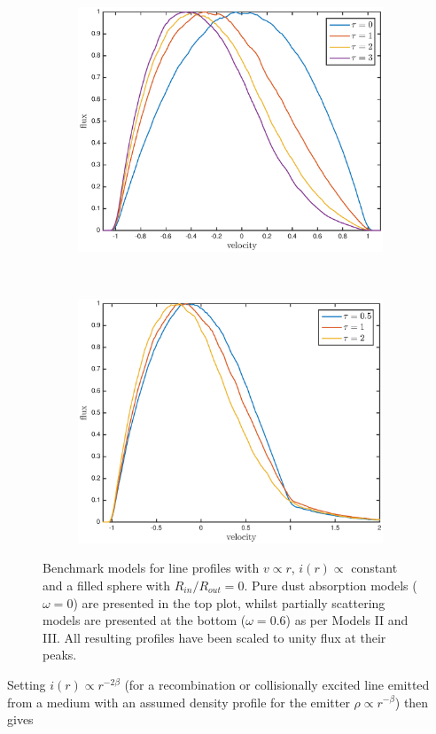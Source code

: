 \begin{figure}
\begin{subfigure}{\textwidth}
\centering
\includegraphics[trim =37 10 45 15,clip=true,scale=0.75]{chapters/chapter4/images/params/opt_thick_w0}
\end{subfigure} \\[1ex]
\begin{subfigure}{\textwidth} 
\centering
\includegraphics[trim =37 10 45 15,clip=true,scale=0.75]{chapters/chapter4/images/params/opt_thick_w0_6}
\end{subfigure}  
\caption{Benchmark models for line profiles  with $v \propto r$, $i(r) \propto$ constant and a filled sphere with $R_{in}/R_{out}=0$.  Pure dust absorption models ($\omega = 0$) are presented in the top plot, whilst partially scattering models are presented at the bottom ($\omega = 0.6$) as per \citet{Lucy1989} Models II and III. All resulting profiles have been scaled to unity flux at their peaks.}
\label{fig:Lucy}
\end{figure}
Setting $i(r) \propto r^{-2\beta}$ (for a recombination or collisionally excited line emitted from 
a medium with an assumed density profile for the emitter $\rho \propto 
r^{-\beta}$) then gives

